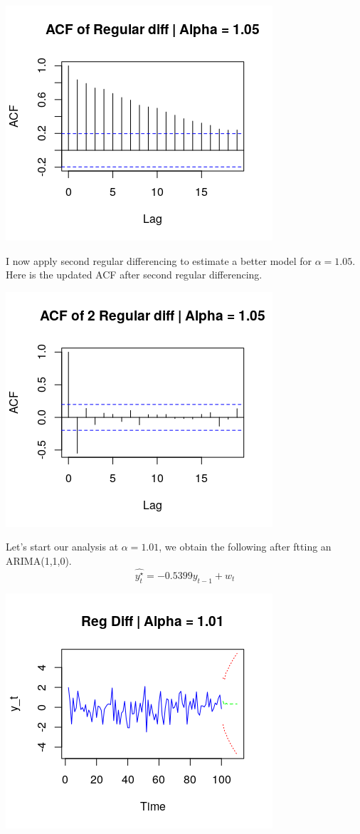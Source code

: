 \documentclass[11pt]{article}
\begin{document}
\begin{center}
\includegraphics[scale=1]{1c3}
\end{center}
I now apply second regular differencing to estimate a better model for $\alpha = 1.05$. Here is the updated ACF after second regular differencing.
\begin{center}
\includegraphics[scale=1]{1c3_5}
\end{center}
Let's start our analysis at $\alpha = 1.01$, we obtain the following after ftting an ARIMA(1,1,0).
$$ \hat{y_t^\star} = -0.5399y_{t-1} + w_t $$
\begin{center}
\includegraphics[scale=1]{1c4}
\end{center}
\end{document}
